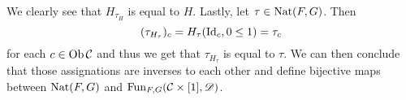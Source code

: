 \documentclass[11pt, a4paper, twoside]{article}
\begin{document}
	We clearly see that $H_{\tau_H}$ is equal to $H$. Lastly, let $\tau\in\operatorname{Nat}(F,G)$. Then 
		\begin{displaymath}
			(\tau_{H_\tau})_c=H_\tau(\mathrm{Id}_c,0\leq1)=\tau_c
		\end{displaymath}
			for each $c\in\operatorname{Ob}\mathcal{C}$ and thus we get that $\tau_{H_\tau}$ is equal to $\tau$. We can then conclude that those assignations are inverses to each other and define bijective maps between $\operatorname{Nat}(F,G)$ and $\operatorname{Fun}_{F,G}(\mathcal{C}\times[1],\mathscr D)$.
	
\end{document}
